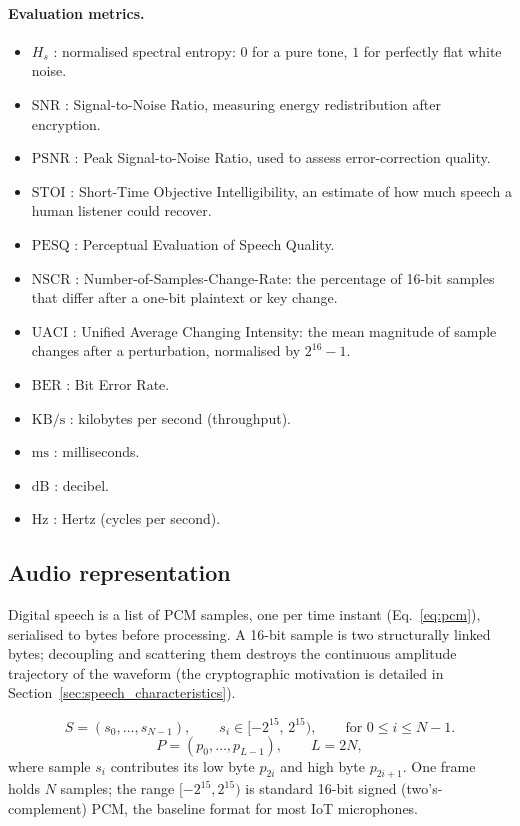 \documentclass[pdflatex,sn-mathphys-num]{sn-jnl}%
\theoremstyle{thmstyleone}%
\theoremstyle{thmstyletwo}%
\theoremstyle{thmstylethree}%
\begin{document}
\paragraph{Evaluation metrics.}
\begin{itemize}[leftmargin=2em]
\item $H_s$ : normalised spectral entropy: $0$ for a pure tone, $1$ for perfectly flat white noise.
\item $\mathrm{SNR}$ : Signal-to-Noise Ratio, measuring energy redistribution after encryption.
\item $\mathrm{PSNR}$ : Peak Signal-to-Noise Ratio, used to assess error-correction quality.
\item $\mathrm{STOI}$ : Short-Time Objective Intelligibility, an estimate of how much speech a human listener could recover.
\item $\mathrm{PESQ}$ : Perceptual Evaluation of Speech Quality.
\item $\mathrm{NSCR}$ : Number-of-Samples-Change-Rate: the percentage of 16-bit samples that differ after a one-bit plaintext or key change.
\item $\mathrm{UACI}$ : Unified Average Changing Intensity: the mean magnitude of sample changes after a perturbation, normalised by $2^{16}-1$.
\item $\mathrm{BER}$ : Bit Error Rate.
\item $\mathrm{KB/s}$ : kilobytes per second (throughput).
\item $\mathrm{ms}$ : milliseconds.
\item $\mathrm{dB}$ : decibel.
\item $\mathrm{Hz}$ : Hertz (cycles per second).
\end{itemize}

\subsection{Audio representation}
\label{sec:audiorep}
Digital speech is a list of PCM samples, one per time instant (Eq.~\eqref{eq:pcm}), serialised to bytes before processing. A 16-bit sample is two structurally linked bytes; decoupling and scattering them destroys the continuous amplitude trajectory of the waveform (the cryptographic motivation is detailed in Section~\ref{sec:speech_characteristics}).

\begin{equation}
S = (s_0,\dots,s_{N-1}), \qquad s_i \in [-2^{15},\,2^{15}), \qquad \text{for } 0 \le i \le N-1.
\label{eq:pcm}
\end{equation}
\begin{equation}
P = (p_0,\dots,p_{L-1}), \qquad L = 2N,
\label{eq:serial}
\end{equation}
where sample $s_i$ contributes its low byte $p_{2i}$ and high byte $p_{2i+1}$. One frame holds $N$ samples; the range $[-2^{15},2^{15})$ is standard 16-bit signed (two's-complement) PCM, the baseline format for most IoT microphones.
\end{document}
